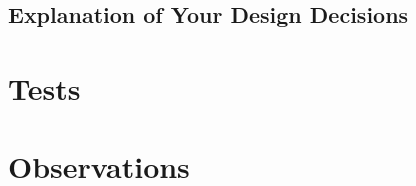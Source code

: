 \begin{enumerate}
\end{enumerate}


\subsection{Explanation of Your Design Decisions}


\section{Tests}



\section{Observations}


